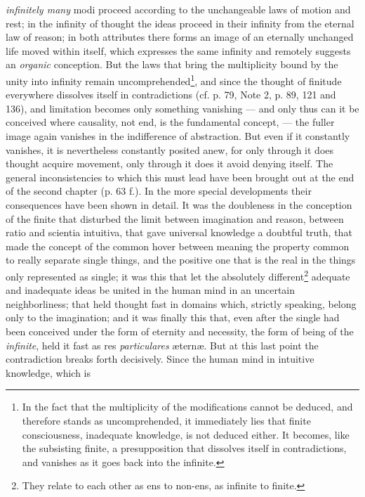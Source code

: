 \documentclass[12pt,a4paper,openany]{book}
\newcommand{\opage}[1]{\marginnote{\footnotesize\textit{[#1]}}}
\begin{document}
\emph{infinitely many} modi proceed according to the unchangeable
laws of motion and rest; in the infinity of thought the ideas proceed in
their infinity from the eternal law of reason; in both attributes
there forms an image of an eternally unchanged life moved within itself,
which expresses the same infinity and
remotely suggests an \emph{organic} conception. But the laws that
bring the multiplicity bound by the unity into infinity
remain uncomprehended\footnote{In the fact that the multiplicity
of the modifications cannot be deduced, and therefore stands as
uncomprehended, it immediately lies that finite consciousness,
inadequate knowledge, is not deduced either.
It becomes, like the subsisting finite, a presupposition
that dissolves itself in contradictions, and vanishes as it
goes back into the infinite.}, and since the thought of finitude
everywhere dissolves itself in contradictions (cf. p. 79, Note 2, p. 89,
121 and 136), and limitation becomes only something vanishing
--- and only thus can it be conceived where causality, not
end, is the fundamental concept, --- the fuller
image again vanishes in the indifference of abstraction. But even if it
constantly vanishes, it is nevertheless constantly posited anew,
for only through it does thought acquire movement, only through it does it avoid
denying itself. The general inconsistencies to which
this must lead have been brought out at the end
of the second chapter (p. 63 f.). In the more special developments
their consequences have been shown in detail. It was the
\opage{177}\setcounter{footnote}{0}doubleness in the conception of the finite that disturbed the limit
between imagination and reason, between ratio and
scientia intuitiva, that gave universal knowledge a doubtful
truth, that made the concept of the common hover
between meaning the property common to really separate single things,
and the positive one that is the real in
the things only represented as single; it was this that let
the absolutely different\footnote{They relate to each other as
ens to non-ens, as infinite to finite.} adequate and
inadequate ideas be united in the human mind in an
uncertain neighborliness; that held thought fast in domains which,
strictly speaking, belong only to the imagination; and it was finally
this that, even after the single had been conceived under
the form of eternity and necessity, the form of being of the \emph{infinite},
held it fast as res \emph{particulares} æternæ. But
at this last point the contradiction breaks forth decisively.
Since the human mind in intuitive knowledge, which is
\end{document}
